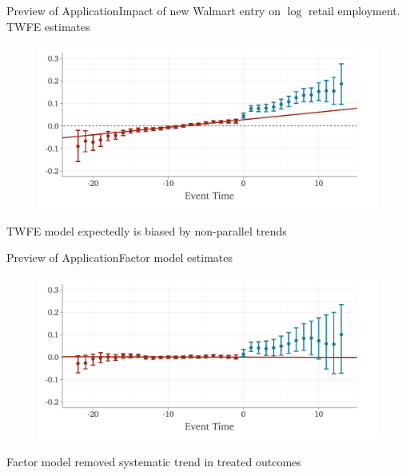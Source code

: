 \documentclass[aspectratio=43,t,11pt]{beamer}
\begin{document}
\begin{frame}{Preview of Application}{Impact of new Walmart entry on $\log$ retail employment. TWFE estimates}
  \vspace{-7.5mm}
  \begin{figure}
    \begin{adjustbox}{width=0.9\textwidth}
      \includegraphics{../figures/plot_did2s_retail.pdf}
    \end{adjustbox}
  \end{figure}

  TWFE model expectedly is biased by non-parallel trends 
\end{frame}

\begin{frame}{Preview of Application}{Factor model estimates}
  \vspace{-7.5mm}
  \begin{figure}
    \begin{adjustbox}{width=0.9\textwidth}
      \includegraphics{../figures/plot_qld_retail.pdf}
    \end{adjustbox}
  \end{figure}

  Factor model removed systematic trend in treated outcomes
\end{frame}
\end{document}
